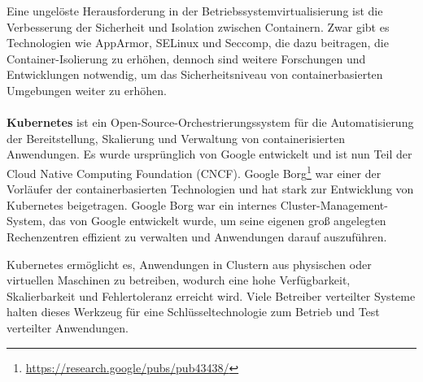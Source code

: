 Eine ungelöste Herausforderung in der Betriebssystemvirtualisierung ist die Verbesserung der Sicherheit und Isolation zwischen Containern. Zwar gibt es Technologien wie AppArmor, SELinux und Seccomp, die dazu beitragen, die Container-Isolierung zu erhöhen, dennoch sind weitere Forschungen und Entwicklungen notwendig, um das Sicherheitsniveau von containerbasierten Umgebungen weiter zu erhöhen.
\\\\
\textbf{Kubernetes} ist ein Open-Source-Orchestrierungssystem für die Automatisierung der Bereitstellung, Skalierung und Verwaltung von containerisierten Anwendungen. Es wurde ursprünglich von Google entwickelt und ist nun Teil der Cloud Native Computing Foundation (CNCF). Google Borg\footnote{\url{https://research.google/pubs/pub43438/}} war einer der Vorläufer der containerbasierten Technologien und hat stark zur Entwicklung von Kubernetes beigetragen.  Google Borg war ein internes Cluster-Management-System, das von Google entwickelt wurde, um seine eigenen groß angelegten Rechenzentren effizient zu verwalten und Anwendungen darauf auszuführen. 

Kubernetes ermöglicht es, Anwendungen in Clustern aus physischen oder virtuellen Maschinen zu betreiben, wodurch eine hohe Verfügbarkeit, Skalierbarkeit und Fehlertoleranz erreicht wird. Viele Betreiber verteilter Systeme halten dieses Werkzeug für eine Schlüsseltechnologie zum Betrieb und Test verteilter Anwendungen.

